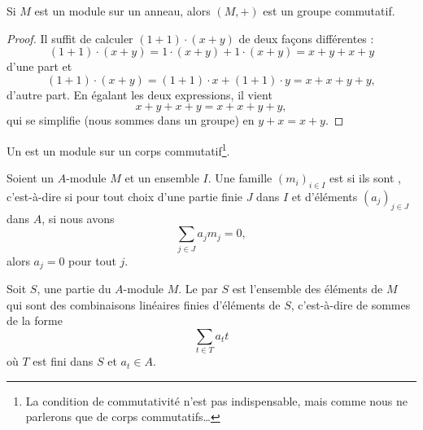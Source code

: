 \begin{proposition}\label{PROPooGARGooDiMqtN}
    Si \( M\) est un module sur un anneau, alors \( (M,+)\) est un groupe commutatif.
\end{proposition}

\begin{proof}
    Il suffit de calculer \( (1+1)\cdot (x+y)\) de deux façons différentes :
    \begin{equation}
        (1+1)\cdot (x+y)=1\cdot (x+y)+1\cdot (x+y)=x+y+x+y
    \end{equation}
    d'une part et
    \begin{equation}
        (1+1)\cdot (x+y)=(1+1)\cdot x+(1+1)\cdot y=x+x+y+y,
    \end{equation}
    d'autre part. En égalant les deux expressions, il vient
    \begin{equation}
        x+y+x+y=x+x+y+y,
    \end{equation}
    qui se simplifie (nous sommes dans un groupe) en \( y+x=x+y\).
\end{proof}

\begin{definition}\label{DEFooKHWZooIfxdNc}
    Un  est un module sur un corps commutatif\footnote{La condition de commutativité n'est pas indispensable, mais comme nous ne parlerons que de corps commutatifs\ldots}.
\end{definition}

\begin{definition}        \label{DEFooRUKVooLnXxdS}
    Soient un \( A\)-module \( M\) et un ensemble \( I\). Une famille \( (m_i)_{i\in I}\) est  si ils sont , c'est-à-dire si pour tout choix d'une partie finie \( J\) dans \( I\) et d'éléments \( (a_j)_{j\in J}\) dans \( A\), si nous avons
    \begin{equation}
        \sum_{j\in J}a_jm_j=0,
    \end{equation}
    alors \( a_j=0\) pour tout \( j\).
\end{definition}

\begin{definition}        \label{DEFooWBOBooJNyyBF}
    Soit \( S\), une partie du \( A\)-module \( M\). Le  par \( S\) est l'ensemble des éléments de \( M\) qui sont des combinaisons linéaires finies d'éléments de \( S\), c'est-à-dire de sommes de la forme
    \begin{equation}
        \sum_{t\in T}a_tt
    \end{equation}
    où \( T\) est fini dans \( S\) et \( a_t\in A\).
\end{definition}

